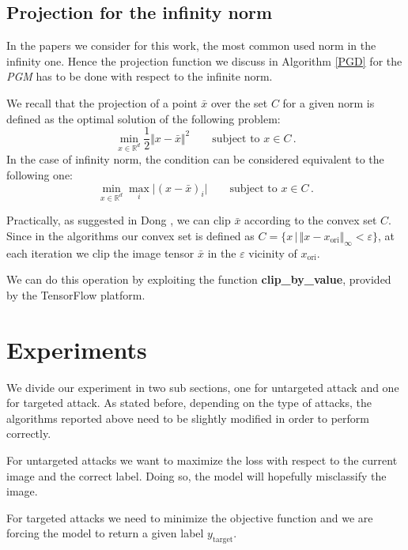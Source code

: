 \documentclass[10pt,twocolumn,letterpaper, english]{article}
\theoremstyle{definition}
\theoremstyle{plain}
\theoremstyle{plain}
\theoremstyle{plain}
\theoremstyle{plain}
\theoremstyle{remark}
\theoremstyle{remark}
\theoremstyle{definition}
\theoremstyle{definition}
\theoremstyle{definition}
\theoremstyle{definition}
\renewcommand{\epsilon}{\varepsilon}
\begin{document}
\subsection{Projection for the infinity norm}

In the papers we consider for this work, the most common used norm in the infinity one. 
Hence the projection function we discuss in Algorithm \ref{PGD} for the \textit{PGM} has to be done with respect to the infinite norm. 

We recall that the projection of a point $\bar{x}$ over the set $C$ for a given norm is defined as the optimal solution of the following problem: 
\begin{equation*}
    \min_{x \in \mathbb{R}^d} \frac{1}{2} \Vert x - \bar{x} \Vert^2 \qquad \text{subject to } x \in C\,.
\end{equation*}
In the case of infinity norm, the condition can be considered equivalent to the following one: 
\begin{equation*}
    \min_{x \in \mathbb{R}^d}  \max_i \vert (x - \bar{x})_i \vert \qquad \text{subject to } x \in C\,.
\end{equation*}

Practically, as suggested in Dong \cite{momentum}, we can clip $\bar{x}$ according to the convex set $C$. 
Since in the algorithms our convex set is defined as $C = \{ x \,|\, \Vert x - x_{\text{ori}} \Vert_\infty < \epsilon \}$, at each iteration we clip the image tensor $\bar{x}$ in the $\epsilon$ vicinity of $x_{\text{ori}}$. 

We can do this operation by exploiting the function \textbf{clip\_by\_value}, provided by the TensorFlow platform. 


\section{Experiments}
We divide our experiment in two sub sections, one for untargeted attack and one for targeted attack. As stated before, depending on the type of attacks, the algorithms reported above need to be slightly modified in order to perform correctly.

For untargeted attacks we want to maximize the loss with respect to the current image and the correct label. Doing so, the model will hopefully misclassify the image.

For targeted attacks we need to minimize the objective function and we are forcing the model to return a given label $y_{\text{target}}$.
\end{document}
